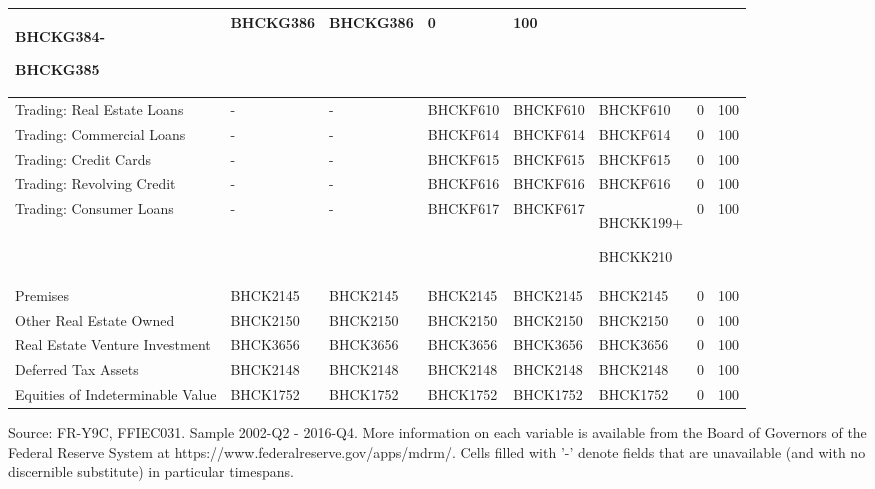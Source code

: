 \begin{landscape}
\begin{longtable}{|>{\raggedright}p{3cm}|>{\raggedright}p{2.2cm}|>{\raggedright}p{2.2cm}|>{\raggedright}p{2.2cm}|>{\raggedright}p{2.5cm}|>{\raggedright}p{2.5cm}|>{\raggedright}p{1cm}|>{\raggedright}p{1cm}|}
BHCKG384-

BHCKG385  & BHCKG386  & BHCKG386  & 0  & 100\tabularnewline
\hline 
Trading: Real Estate Loans  & -  & -  & BHCKF610  & BHCKF610  & BHCKF610  & 0  & 100\tabularnewline
\hline 
Trading: Commercial Loans  & -  & -  & BHCKF614  & BHCKF614  & BHCKF614  & 0  & 100\tabularnewline
\hline 
Trading: Credit Cards  & -  & -  & BHCKF615  & BHCKF615  & BHCKF615  & 0  & 100\tabularnewline
\hline 
Trading: Revolving Credit  & -  & -  & BHCKF616  & BHCKF616  & BHCKF616  & 0  & 100\tabularnewline
\hline 
Trading: Consumer Loans  & -  & -  & BHCKF617  & BHCKF617  & BHCKK199+

BHCKK210  & 0  & 100\tabularnewline
\hline 
Premises  & BHCK2145  & BHCK2145  & BHCK2145  & BHCK2145  & BHCK2145  & 0  & 100\tabularnewline
\hline 
Other Real Estate Owned  & BHCK2150  & BHCK2150  & BHCK2150  & BHCK2150  & BHCK2150  & 0  & 100\tabularnewline
\hline 
Real Estate Venture Investment  & BHCK3656  & BHCK3656  & BHCK3656  & BHCK3656  & BHCK3656  & 0  & 100\tabularnewline
\hline 
Deferred Tax Assets  & BHCK2148  & BHCK2148  & BHCK2148  & BHCK2148  & BHCK2148  & 0  & 100\tabularnewline
\hline 
Equities of Indeterminable Value  & BHCK1752  & BHCK1752  & BHCK1752  & BHCK1752  & BHCK1752  & 0  & 100\tabularnewline
\hline 
\end{longtable}

{Source: FR-Y9C, FFIEC031. Sample 2002-Q2 - 2016-Q4. More information
on each variable is available from the Board of Governors of the Federal
Reserve System at https://www.federalreserve.gov/apps/mdrm/. Cells
filled with '-' denote fields that are unavailable (and with no discernible
substitute) in particular timespans.}
\newpage{}


\end{landscape}
